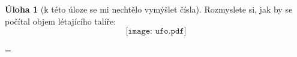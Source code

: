 \documentclass[10pt,a5paper]{article}
\theoremstyle{definition}
\newtheorem{uloha}{Úloha}
\let\ee\expandafter
\def\vysld{}
\let\printvysl\relax
\begin{document}
\begin{uloha}[k této úloze se mi nechtělo vymýšlet čísla]
Rozmyslete si, jak by se počítal objem létajícího talíře:
\[ \texttt{[image: ufo.pdf]} \]
\end{uloha}




\newpage
\parindent=0pt
\parskip=\smallskipamount
\def\printvysl#1#2{\textbf{#1.}\ #2\par}
\vysld
\end{document}
